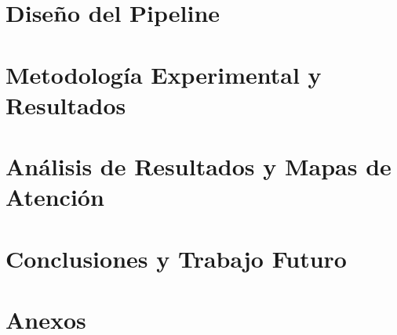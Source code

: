 \documentclass{thesis-tg-ie-pujc} %
\begin{document}
\chapter{Diseño del Pipeline}


\chapter{Metodología Experimental y Resultados}



\chapter{Análisis de Resultados y Mapas de Atención}


%
\chapter{Conclusiones y Trabajo Futuro}


%

\chapter{Anexos}






\printindex
\end{document}
